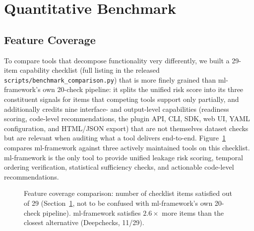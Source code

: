 \documentclass[11pt]{article}
\begin{document}
\section{Quantitative Benchmark}
\label{sec:benchmark}

\subsection{Feature Coverage}

To compare tools that decompose functionality very differently, we built a
29-item capability checklist (full listing in the released
\texttt{scripts/benchmark\_comparison.py}) that is more finely grained than
ml-framework's own 20-check pipeline: it splits the unified risk score into
its three constituent signals for items that competing tools support only
partially, and additionally credits nine interface- and output-level
capabilities (readiness scoring, code-level recommendations, the plugin
API, CLI, SDK, web UI, YAML configuration, and HTML/JSON export) that are
not themselves dataset checks but are relevant when auditing what a tool
delivers end-to-end.  Figure~\ref{fig:coverage} compares ml-framework
against three actively maintained tools on this checklist.  ml-framework is
the only tool to provide unified leakage risk scoring, temporal ordering
verification, statistical sufficiency checks, and actionable code-level
recommendations.

\begin{figure}[!ht]
\centering
{}
\caption{Feature coverage comparison: number of checklist items satisfied
  out of 29 (Section~\ref{sec:benchmark}, not to be confused with
  ml-framework's own 20-check pipeline).  ml-framework satisfies $2.6\times$
  more items than the closest alternative (Deepchecks, 11/29).}
\label{fig:coverage}
\end{figure}
\end{document}
